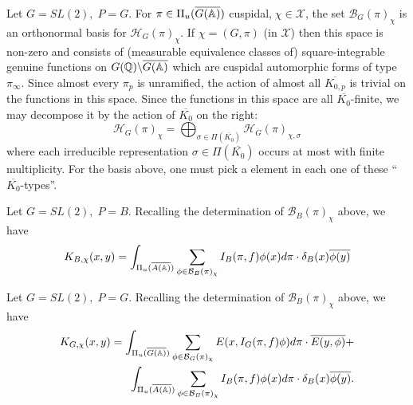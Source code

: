 \begin{example}\label{ex:5.19}
Let $G=SL(2),\;P=G$. For $\pi \in \Pi _u(\overline{G(\mathbb{A} )})$
cuspidal,$\;\chi \in 
\mathcal{X}$, the set ${\mathcal{B}}_G(\pi )_\chi $ is an orthonormal basis
for ${\mathcal{H}}_G(\pi )_\chi $. If $\chi = (G,\pi )$
(in $\mathcal{X}$) then this space is non-zero and consists of
(measurable equivalence classes of) square-integrable
genuine functions on $G(\mathbb{Q} )\backslash \overline{G(\mathbb{A} )}$
which are cuspidal automorphic forms of type $\pi_\infty $.
Since almost every $\pi _p$ is unramified, the action of almost
all $\overline{K_{0,p}}$ is trivial on the
functions in this space. Since the functions in
this space are all $\overline{K_0}$-finite,
we may decompose it by the action of $\overline{K_0}$ on
the right: 
\[
{\mathcal{H}}_G(\pi )_\chi =
\bigoplus_{\sigma \in \Pi(\overline{K_0})}
{\mathcal{H}}_G(\pi )_{\chi ,\sigma }
\]
where each irreducible representation
$\sigma \in \Pi(\overline{K_0})$ occurs at
most with finite multiplicity. For the basis above, one must pick a element
in each one of these ``$\overline{K_0}$-types''.
\end{example}

\begin{example}\label{ex:5.20}
Let $G=SL(2),\;P=B$. Recalling the determination of
${\mathcal{B}}_B(\pi)_\chi $ above, we have 
\[
K_{B,\chi }(x,y)
=\int_{\Pi _u(\overline{A(\mathbb{A} )})}
\sum_{\phi \in {\mathcal{B}}_B(\pi)_\chi }
I_B(\pi ,f)\phi (x)d\pi \cdot \delta _B(x)\overline{\phi (y)}
\]
\end{example}

\begin{example}\label{ex:5.21}
Let $G=SL(2),\;P=G$. Recalling the determination
of ${\mathcal{B}}_B(\pi)_\chi $ above, we have 
\begin{eqnarray*}
K_{G,\chi }(x,y)
=\int_{\Pi _u(\overline{G(\mathbb{A} )})}
\sum_{\phi \in {\mathcal{B}}_G(\pi)_\chi }
E(x,I_G(\pi ,f)\phi )d\pi \cdot \overline{E(y,\phi )}+ \\
\int_{\Pi _u(\overline{A(\mathbb{A} )})}
\sum_{\phi \in {\mathcal{B}}_B(\pi )_\chi }
I_B(\pi,f)\phi (x)d\pi \cdot \delta _B(x)\overline{\phi (y)}.
\end{eqnarray*}
\end{example}

